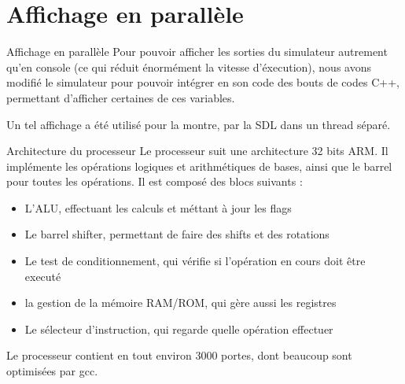 \documentclass[11pt]{beamer}
\begin{document}
\section{Affichage en parallèle}

\begin{frame}{Affichage en parallèle}
  Pour pouvoir afficher les sorties du simulateur autrement qu'en console (ce
  qui réduit énormément la vitesse d'éxecution), nous avons modifié le
  simulateur pour pouvoir intégrer en son code des bouts de codes C++,
  permettant d'afficher certaines de ces variables.
  
  Un tel affichage a été utilisé pour la montre, par la SDL dans un thread séparé.
\end{frame}

\begin{frame}{Architecture du processeur}
  Le processeur suit une architecture 32 bits ARM. Il implémente les opérations
  logiques et arithmétiques de bases, ainsi que le barrel pour toutes les
  opérations.
  Il est composé des blocs suivants :
  \begin{itemize}
  \item{L'ALU, effectuant les calculs et méttant à jour les flags}
  \item{Le barrel shifter, permettant de faire des shifts et des rotations}
  \item{Le test de conditionnement, qui vérifie si l'opération en cours doit
      être executé}
  \item{la gestion de la mémoire RAM/ROM, qui gère aussi les registres}
  \item{Le sélecteur d'instruction, qui regarde quelle opération effectuer}
  \end{itemize}
  Le processeur contient en tout environ 3000 portes, dont beaucoup sont
  optimisées par gcc.
\end{frame}
\end{document}

